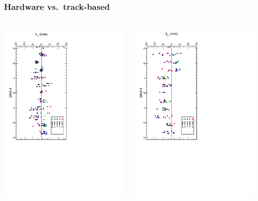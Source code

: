 \documentclass[compress]{beamer}
\begin{document}
\begin{frame}
\frametitle{Hardware vs.\ track-based}

\begin{columns}
\includegraphics[height=\linewidth, angle=90]{NOV4DT_vs_HARDWAREadjust_x.pdf}

\includegraphics[height=\linewidth, angle=90]{NOV4DT_vs_HARDWAREadjust_y.pdf}


\end{columns}
\end{frame}
\end{document}
